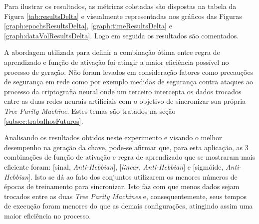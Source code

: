 \documentclass[a4paper,10pt,oneside,conference,final,keeplastbox]{inatel}
\begin{document}
                Para ilustrar os resultados, as métricas coletadas são dispostas na tabela da Figura \ref{tab:resultsDelta} e visualmente representadas nos gráficos das Figuras \ref{graph:epochsResultsDelta}, \ref{graph:timeResultsDelta} e \ref{graph:dataVolResultsDelta}. Logo em seguida os resultados são comentados. 
                
                
                
                
                
            
                
                
                
                
                
                A abordagem utilizada para definir a combinação ótima entre regra de aprendizado e função de ativação foi atingir a maior eficiência possível no processo de geração. Não foram levados em consideração fatores como precauções de segurança em rede como por exemplo medidas de segurança contra ataques ao processo da criptografia neural onde um terceiro intercepta os dados trocados entre as duas redes neurais artificiais com o objetivo de sincronizar sua própria \textit{Tree Parity Machine}. Estes temas são tratados na seção \ref{subsec:trabalhosFuturos}.
                
                Analisando os resultados obtidos neste experimento e visando o melhor desempenho na geração da chave, pode-se afirmar que, para esta aplicação, as 3 combinações de função de ativação e regra de aprendizado que se mostraram mais eficiente foram: [sinal, \textit{Anti-Hebbian}], [\textit{linear}, \textit{Anti-Hebbian}] e [sigmóide, \textit{Anti-Hebbian}]. Isto se dá ao fato dos conjuntos utilizarem os menores números de épocas de treinamento para sincronizar. Isto faz com que menos dados sejam trocados entre as duas \textit{Tree Parity Machines} e, consequentemente, seus tempos de execução foram menores do que as demais configurações, atingindo assim uma maior eficiência no processo.
                
\end{document}
